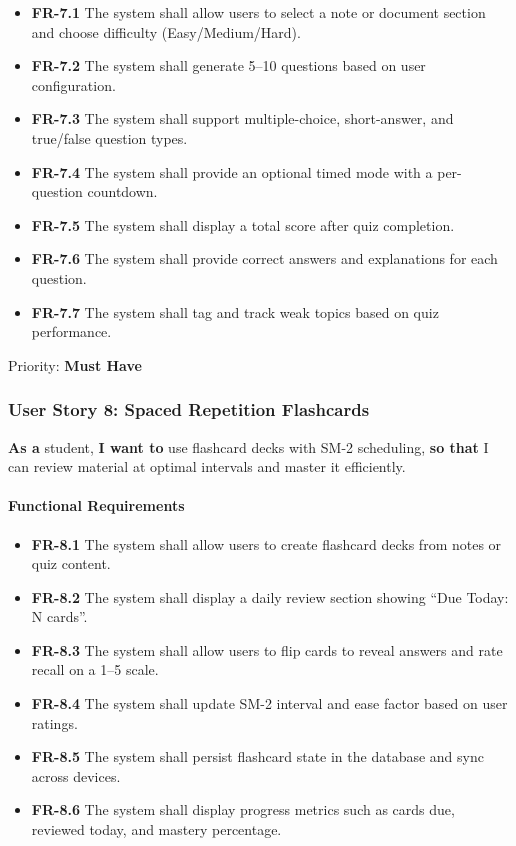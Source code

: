 \documentclass[12pt,a4paper]{article}
\begin{document}
\begin{itemize}
    \item \textbf{FR-7.1} The system shall allow users to select a note or document section and choose difficulty (Easy/Medium/Hard).
    \item \textbf{FR-7.2} The system shall generate 5--10 questions based on user configuration.
    \item \textbf{FR-7.3} The system shall support multiple-choice, short-answer, and true/false question types.
    \item \textbf{FR-7.4} The system shall provide an optional timed mode with a per-question countdown.
    \item \textbf{FR-7.5} The system shall display a total score after quiz completion.
    \item \textbf{FR-7.6} The system shall provide correct answers and explanations for each question.
    \item \textbf{FR-7.7} The system shall tag and track weak topics based on quiz performance.
\end{itemize}

Priority: \textbf{Must Have}

\subsubsection{User Story 8: Spaced Repetition Flashcards}

\textbf{As a} student, \textbf{I want to} use flashcard decks with SM-2 scheduling, \textbf{so that} I can review material at optimal intervals and master it efficiently.

\paragraph{Functional Requirements}

\begin{itemize}
    \item \textbf{FR-8.1} The system shall allow users to create flashcard decks from notes or quiz content.
    \item \textbf{FR-8.2} The system shall display a daily review section showing ``Due Today: N cards''.
    \item \textbf{FR-8.3} The system shall allow users to flip cards to reveal answers and rate recall on a 1--5 scale.
    \item \textbf{FR-8.4} The system shall update SM-2 interval and ease factor based on user ratings.
    \item \textbf{FR-8.5} The system shall persist flashcard state in the database and sync across devices.
    \item \textbf{FR-8.6} The system shall display progress metrics such as cards due, reviewed today, and mastery percentage.
\end{itemize}
\end{document}
